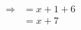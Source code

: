 \documentclass[preview]{standalone}
\begin{document}
\begin{align*}
\Rightarrow & =x+1+6\\ & = x+7
\end{align*}
\end{document}
